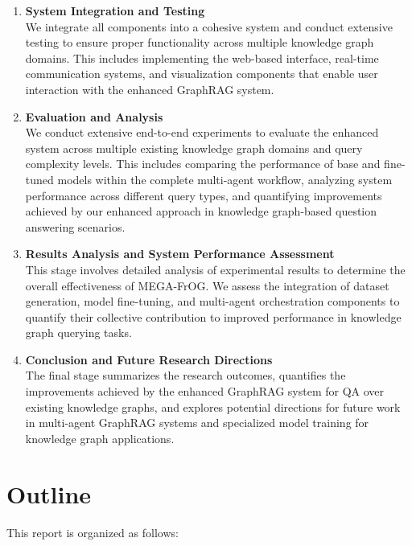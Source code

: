 \begin{enumerate}
    \item \textbf{System Integration and Testing} \\
    We integrate all components into a cohesive system and conduct extensive testing to ensure proper functionality across multiple knowledge graph domains. This includes implementing the web-based interface, real-time communication systems, and visualization components that enable user interaction with the enhanced GraphRAG system.

    \item \textbf{Evaluation and Analysis} \\
    We conduct extensive end-to-end experiments to evaluate the enhanced system across multiple existing knowledge graph domains and query complexity levels. This includes comparing the performance of base and fine-tuned models within the complete multi-agent workflow, analyzing system performance across different query types, and quantifying improvements achieved by our enhanced approach in knowledge graph-based question answering scenarios.

    \item \textbf{Results Analysis and System Performance Assessment} \\
    This stage involves detailed analysis of experimental results to determine the overall effectiveness of MEGA-FrOG. We assess the integration of dataset generation, model fine-tuning, and multi-agent orchestration components to quantify their collective contribution to improved performance in knowledge graph querying tasks.

    \item \textbf{Conclusion and Future Research Directions} \\
    The final stage summarizes the research outcomes, quantifies the improvements achieved by the enhanced GraphRAG system for QA over existing knowledge graphs, and explores potential directions for future work in multi-agent GraphRAG systems and specialized model training for knowledge graph applications.
\end{enumerate}

\section{Outline}
\label{sec:sistematikaPenulisan}
This report is organized as follows:

